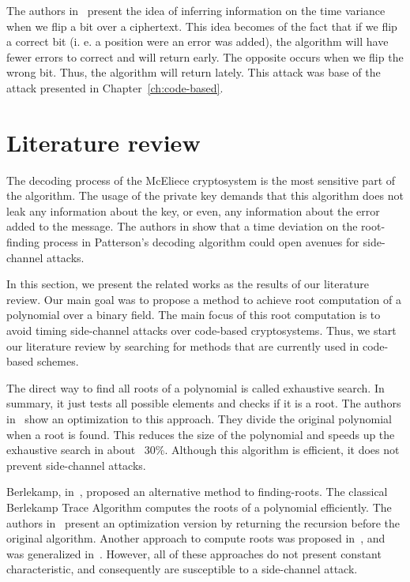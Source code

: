The authors in~\cite{shoufan2009timing} present the idea of inferring information on the time variance when we flip a bit over a ciphertext. This idea becomes of the fact that if we flip a correct bit (i. e. a position were an error was added), the algorithm will have fewer errors to correct and will return early. The opposite occurs when we flip the wrong bit. Thus, the algorithm will return lately. This attack was base of the attack presented in Chapter~\ref{ch:code-based}.


\section{Literature review}
The decoding process of the McEliece cryptosystem is the most sensitive part of the algorithm. The usage of the private key demands that this algorithm does not leak any information about the key, or even, any information about the error added to the message. The authors in \cite{bucerzan2017improved} show that a time deviation on the root-finding process in Patterson's decoding algorithm could open avenues for side-channel attacks. 

In this section, we present the related works as the results of our literature review. Our main goal was to propose a method to achieve root computation of a polynomial over a binary field. The main focus of this root computation is to avoid timing side-channel attacks over code-based cryptosystems. Thus, we start our literature review by searching for methods that are currently used in code-based schemes.

The direct way to find all roots of a polynomial is called exhaustive search. In summary, it just tests all possible elements and checks if it is a root. The authors in~\cite{strenzke2012fast} show an optimization to this approach. They divide the original polynomial when a root is found. This reduces the size of the polynomial and speeds up the exhaustive search in about ~30\%. Although this algorithm is efficient, it does not prevent side-channel attacks.

Berlekamp, in~\cite{berlekamp1970factoring}, proposed an alternative method to finding-roots. The classical Berlekamp Trace Algorithm computes the roots of a polynomial efficiently. The authors in~\cite{strenzke2012fast} present an optimization version by returning the recursion before the original algorithm. Another approach to compute roots was proposed in~\cite{fedorenko2002finding}, and was generalized in~\cite{Skachek2008, biswas2009}. However, all of these approaches do not present constant characteristic, and consequently are susceptible to a side-channel attack.

